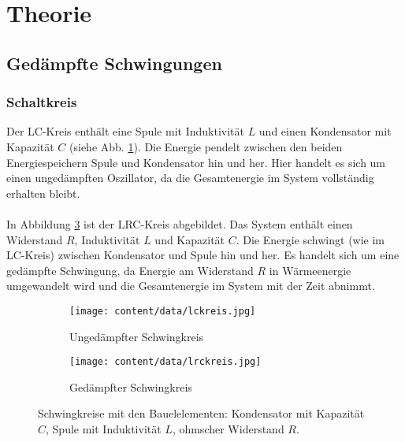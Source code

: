 \section{Theorie}
\label{sec:Theorie}

\subsection{Gedämpfte Schwingungen}
\subsubsection{Schaltkreis}
Der LC-Kreis enthält eine Spule mit Induktivität $L$ und einen Kondensator mit Kapazität $C$ (siehe Abb. \ref{fig:lckreis}).
Die Energie pendelt zwischen den beiden Energiespeichern Spule und Kondensator hin und her.
Hier handelt es sich um einen ungedämpften Oszillator, da die Gesamtenergie im System vollständig erhalten bleibt.
\\\\
In Abbildung \ref{fig:lrckreis} ist der LRC-Kreis abgebildet.
Das System enthält einen Widerstand $R$, Induktivität $L$ und Kapazität $C$.
Die Energie schwingt (wie im LC-Kreis) zwischen Kondensator und Spule hin und her.
Es handelt sich um eine gedämpfte Schwingung, da Energie am Widerstand $R$ in Wärmeenergie umgewandelt wird und die Gesamtenergie im System mit der Zeit abnimmt.

\begin{figure}
    \centering
    \begin{subfigure}{0.48\textwidth}
        \centering
        \texttt{[image: content/data/lckreis.jpg]}
        \caption{Ungedämpfter Schwingkreis}
        \label{fig:lckreis}
    \end{subfigure}
    \begin{subfigure}{0.48\textwidth}
        \centering
        \texttt{[image: content/data/lrckreis.jpg]}
        \caption{Gedämpfter Schwingkreis} 
        \label{fig:lrckreis}
    \end{subfigure}
    \caption{Schwingkreise mit den Bauelelementen: Kondensator mit Kapazität $C$, Spule mit Induktivität $L$, ohmscher Widerstand $R$.}
\end{figure}

